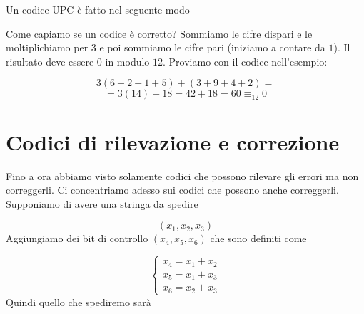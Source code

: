 \documentclass[12pt]{report}
\begin{document}
    \begin{exmp}
        Un codice UPC è fatto nel seguente modo

        \begin{center}
        \end{center}
    \end{exmp}

    \noindent
    Come capiamo se un codice è corretto? Sommiamo le cifre dispari e le moltiplichiamo per $3$ e poi sommiamo le cifre pari (iniziamo a contare da $1$). Il risultato deve essere $0$ in modulo $12$. Proviamo con il codice nell'esempio:

    $$3(6 + 2 + 1 +5) + (3+9+4+2) =$$
    $$= 3(14) + 18 =  42 + 18 = 60 \equiv_{12} 0$$

    \section{Codici di rilevazione e correzione}

    Fino a ora abbiamo visto solamente codici che possono rilevare gli errori ma non correggerli. Ci concentriamo adesso sui codici che possono anche correggerli.  Supponiamo di avere una stringa da spedire

    $$(x_1,x_2,x_3)$$
    Aggiungiamo dei bit di controllo $(x_4,x_5,x_6)$ che sono definiti come

    $$\begin{cases} x_4 = x_1 + x_2 \\
    x_5 = x_1 + x_3 \\
    x_6 = x_2 + x_3\end{cases}$$
    Quindi quello che spediremo sarà
\end{document}

